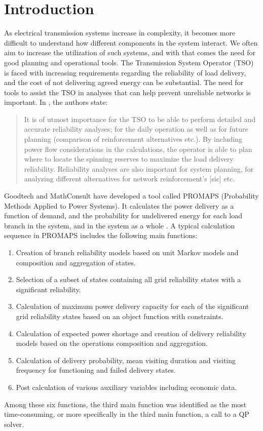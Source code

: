\documentclass[a4paper, twocolumn]{article}
\begin{document}
\section{Introduction}
As electrical transmission systems increase in complexity, it becomes
more difficult to understand how different components in the system interact.
We often aim to increase the utilization of such systems, and with that comes
the need for good planning and operational tools.
The Transmission System Operator (TSO) is faced
with increasing requirements regarding the reliability of load
delivery, and the cost of not delivering agreed energy can be
substantial\cite{digernes}.
The need for tools to assist the TSO in analyses that can help prevent
unreliable networks is important.
In \cite{digernes}, the authors state:
\begin{quote}
It is of utmost importance for the TSO to be able to perform detailed and
accurate reliability analyses; for the daily operation as well as for
future planning (comparison of reinforcement alternatives etc.). By
including power flow considerations in the calculations, the operator is
able to plan where to locate the spinning reserves to maximize the load
delivery reliability. Reliability analyses are also important for system
planning, for analyzing different alternatives for network reinforcement's
[sic] etc.\cite{digernes}
\end{quote}

Goodtech and MathConsult have developed a tool called PROMAPS
(Probability Methods Applied to Power Systems). It calculates the power
delivery as a function of demand, and the probability for undelivered
energy for each load branch in the system, and in the system as a whole
\cite{trond}. A typical calculation sequence in PROMAPS includes the
following main functions\cite{trond}:
\begin{enumerate}
\item Creation of branch reliability models based on unit Markov models and
      composition and aggregation of states.
\item Selection of a subset of states containing all grid reliability states
      with a significant reliability.
\item Calculation of maximum power delivery capacity for each of the
      significant grid reliability states based on an object function with
      constraints.
\item Calculation of expected power shortage and creation of delivery
      reliability models based on the operations composition and aggregation.
\item Calculation of delivery probability, mean visiting duration and visiting
      frequency for functioning and failed delivery states.
\item Post calculation of various auxiliary variables including economic data.
\end{enumerate}
Among these six functions, the third main function was identified as the most
time-consuming, or more specifically in the third main function, a call to a QP
solver\cite{trond}.
\end{document}

